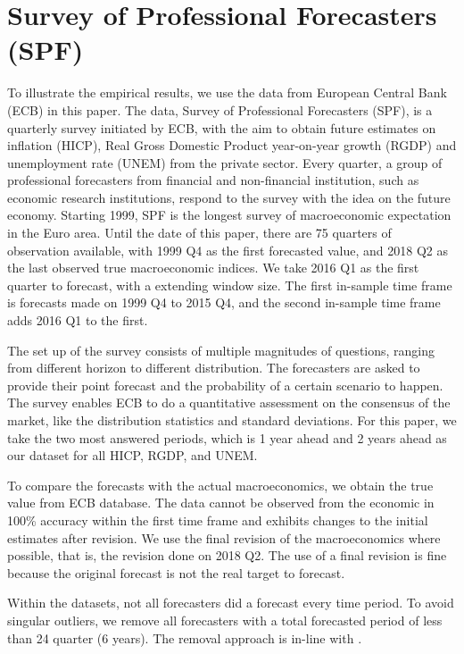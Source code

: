\documentclass[11pt]{article}
\begin{document}
\section{Survey of Professional Forecasters
(SPF)}\label{survey-of-professional-forecasters-spf}

To illustrate the empirical results, we use the data from European Central Bank (ECB) in this paper. The data, Survey of Professional Forecasters (SPF), is a
quarterly survey initiated by ECB, with the aim to obtain future
estimates on inflation (HICP), Real Gross Domestic Product year-on-year growth (RGDP) and unemployment rate (UNEM) from
the private sector. Every quarter, a group of professional forecasters
from financial and non-financial institution, such as economic research
institutions, respond to the survey with the idea on the future
economy. Starting 1999, SPF is the longest survey of macroeconomic
expectation in the Euro area. Until the date of this paper, there are 75
quarters of observation available, with 1999 Q4 as the first forecasted
value, and 2018 Q2 as the last observed true macroeconomic indices. We take 2016 Q1 as the first quarter to forecast, with a extending window size. The first in-sample time frame is forecasts made on 1999 Q4 to 2015 Q4, and the second in-sample time frame adds 2016 Q1 to the first.

The set up of the survey consists of multiple magnitudes of questions,
ranging from different horizon to different distribution. The
forecasters are asked to provide their point forecast and the
probability of a certain scenario to happen. The survey enables ECB to
do a quantitative assessment on the consensus of the market, like the
distribution statistics and standard deviations. For this paper, we take
the two most answered periods, which is 1 year ahead and 2 years ahead
as our dataset for all HICP, RGDP, and UNEM.

To compare the forecasts with the actual macroeconomics, we obtain the
true value from ECB database. The data
cannot be observed from the economic in 100\% accuracy within the first
time frame and exhibits changes to the initial estimates after
revision. We use the final revision of the macroeconomics where
possible, that is, the revision done on 2018 Q2. The use of a final revision is fine because the
original forecast is not the real target to forecast.

Within the datasets, not all forecasters did a forecast every time
period. To avoid singular outliers, we remove all forecasters with a
total forecasted period of less than 24 quarter (6 years). The removal
approach is in-line with \cite{Matsypura2018}.
\end{document}
